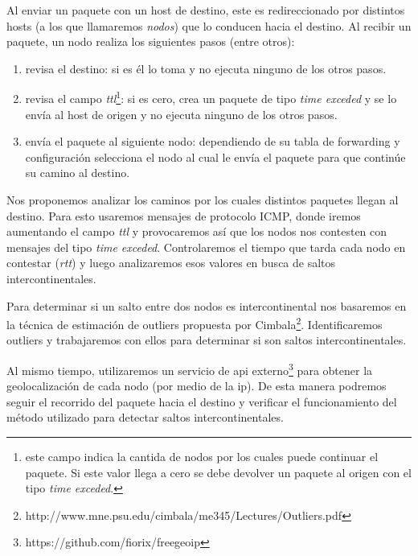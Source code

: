 \par Al enviar un paquete con un host de destino, este es redireccionado por distintos hosts (a los que llamaremos \textit{nodos}) que lo conducen hacia el destino. Al recibir un paquete, un nodo realiza los siguientes pasos (entre otros):
\begin{enumerate}
  \item revisa el destino: si es él lo toma y no ejecuta ninguno de los otros pasos.
  \item revisa el campo \textit{ttl}\footnote{este campo indica la cantida de nodos por los cuales puede continuar el paquete. Si este valor llega a cero se debe devolver un paquete al origen con el tipo \textit{time exceded}.}: si es cero, crea un paquete de tipo \textit{time exceded} y se lo envía al host de origen y no ejecuta ninguno de los otros pasos.
  \item envía el paquete al siguiente nodo: dependiendo de su tabla de forwarding y configuración selecciona el nodo al cual le envía el paquete para que continúe su camino al destino.
\end{enumerate}
\par Nos proponemos analizar los caminos por los cuales distintos paquetes llegan al destino. Para esto usaremos mensajes de protocolo ICMP, donde iremos aumentando el campo \textit{ttl} y provocaremos así que los nodos nos contesten con mensajes del tipo \textit{time exceded}. Controlaremos el tiempo que tarda cada nodo en contestar (\textit{rtt}) y luego analizaremos esos valores en busca de saltos intercontinentales.
\par Para determinar si un salto entre dos nodos es intercontinental nos basaremos en la técnica de estimación de outliers propuesta por Cimbala\footnote{http://www.mne.psu.edu/cimbala/me345/Lectures/Outliers.pdf}. Identificaremos outliers y trabajaremos con ellos para determinar si son saltos intercontinentales.
\par Al mismo tiempo, utilizaremos un servicio de api externo\footnote{https://github.com/fiorix/freegeoip} para obtener la geolocalización de cada nodo (por medio de la ip). De esta manera podremos seguir el recorrido del paquete hacia el destino y verificar el funcionamiento del método utilizado para detectar saltos intercontinentales.
